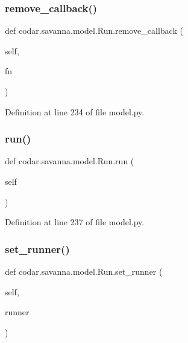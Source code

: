 \subsubsection{\texorpdfstring{remove\+\_\+callback()}{remove\_callback()}}
{\footnotesize\ttfamily def codar.\+savanna.\+model.\+Run.\+remove\+\_\+callback (\begin{DoxyParamCaption}\item[{}]{self,  }\item[{}]{fn }\end{DoxyParamCaption})}



Definition at line 234 of file model.\+py.

\mbox{\label{classcodar_1_1savanna_1_1model_1_1_run_a90816a0d12240402ca7b5754ffc44242}} 
\subsubsection{\texorpdfstring{run()}{run()}}
{\footnotesize\ttfamily def codar.\+savanna.\+model.\+Run.\+run (\begin{DoxyParamCaption}\item[{}]{self }\end{DoxyParamCaption})}



Definition at line 237 of file model.\+py.

\mbox{\label{classcodar_1_1savanna_1_1model_1_1_run_aac3822b6e9166a3c2c5ea7906d89ece9}} 
\subsubsection{\texorpdfstring{set\+\_\+runner()}{set\_runner()}}
{\footnotesize\ttfamily def codar.\+savanna.\+model.\+Run.\+set\+\_\+runner (\begin{DoxyParamCaption}\item[{}]{self,  }\item[{}]{runner }\end{DoxyParamCaption})}



